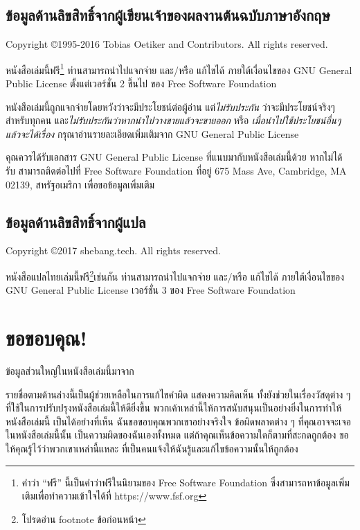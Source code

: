 \section*{ข้อมูลด้านลิขสิทธิ์จากผู้เขียนเจ้าของผลงานต้นฉบับภาษาอังกฤษ}

Copyright \copyright 1995-2016 Tobias Oetiker and
Contributors.  All rights reserved.

หนังสือเล่มนี้ฟรี\footnote{คำว่า ``ฟรี'' นี้เป็นคำว่าฟรีในนิยามของ Free Software
Foundation ซึ่งสามารถหาข้อมูลเพิ่มเติมเพื่อทำความเข้าใจได้ที่ https://www.fsf.org}
ท่านสามารถนำไปแจกจ่าย และ/หรือ แก้ไขได้ ภายใต้เงื่อนไขของ GNU General Public
License ตั้งแต่เวอร์ชั่น 2 ขึ้นไป ของ Free Software Foundation 

หนังสือเล่มนี้ถูกแจกจ่ายโดยหวังว่าจะมีประโยชน์ต่อผู้อ่าน แต่\emph{ไม่รับประกัน}
ว่าจะมีประโยชน์จริงๆสำหรับทุกคน และ\emph{ไม่รับประกันว่าหากนำไปวางขายแล้วจะขายออก}
หรือ \emph{เมื่อนำไปใช้ประโยชน์อื่นๆแล้วจะได้เรื่อง} กรุณาอ่านรายละเอียดเพิ่มเติมจาก GNU
General Public License

คุณควรได้รับเอกสาร GNU General Public License ที่แนบมากับหนังสือเล่มนี้ด้วย หากไม่ได้
รับ สามารถติดต่อไปที่ Free Software Foundation ที่อยู่ 675 Mass Ave, Cambridge,
MA 02139, สหรัฐอเมริกา เพื่อขอข้อมูลเพิ่มเติม

\section*{ข้อมูลด้านลิขสิทธิ์จากผู้แปล}

Copyright \copyright 2017 shebang.tech.  All rights reserved.

หนังสือแปลไทยเล่มนี้ฟรี\footnote{โปรดอ่าน footnote ข้อก่อนหน้า}เช่นกัน
ท่านสามารถนำไปแจกจ่าย และ/หรือ แก้ไขได้ ภายใต้เงื่อนไขของ GNU General Public
License เวอร์ชั่น 3 ของ Free Software Foundation

\chapter{ขอขอบคุณ!}

ข้อมูลส่วนใหญ่ในหนังสือเล่มนี้มาจาก

รายชื่อตามด้านล่างนี้เป็นผู้ช่วยเหลือในการแก้ไขคำผิด แสดงความคิดเห็น ทั้งยังช่วยในเรื่องวัสดุต่าง ๆ 
ที่ใช้ในการปรับปรุงหนังสือเล่มนี้ให้ดียิ่งขึ้น พวกเค้าเหล่านี้ให้การสนับสนุนเป็นอย่างยิ่งในการทำให้หนังสือเล่มนี้
เป็นได้อย่างที่เห็น ฉันขอขอบคุณพวกเขาอย่างจริงใจ ข้อผิดพลาดต่าง ๆ ที่คุณอาจจะเจอในหนังสือเล่มนี้นั้น
เป็นความผิดของฉันเองทั้งหมด แต่ถ้าคุณเห็นข้อความใดก็ตามที่สะกดถูกต้อง ขอให้คุณรู้ไว้ว่าพวกเขาเหล่านี้แหละ
ที่เป็นคนแจ้งให้ฉันรู้และแก้ไขข้อความนั้นให้ถูกต้อง
